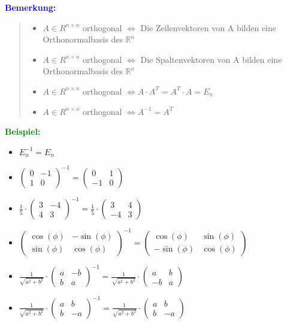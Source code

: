 \documentclass{article}
\newcommand{\blue}[1]{\textcolor{blue}{#1}}
\newcommand{\green}[1]{\textcolor{green}{#1}}
\newcommand{\ex}{\green{\textbf{Beispiel: }}}
\newcommand{\an}[1]{\blue{\textbf{Bemerkung: }}\begin{quote}#1\end{quote}}
\newcommand{\R}{\mathbb{R}}
\begin{document}
\an{
    \begin{itemize}
        \item $A \in R^{n \times n}$ orthogonal $\iff$ Die Zeilenvektoren von A bilden eine Orthonormalbasis des $\R^n$
        \item $A \in R^{n \times n}$ orthogonal $\iff$ Die Spaltenvektoren von A bilden eine Orthonormalbasis des $\R^n$
        \item $A \in R^{n \times n}$ orthogonal $\iff A \cdot A^T = A^T \cdot A = E_n$
        \item $A \in R^{n \times n}$ orthogonal $\iff A^{-1} = A^T$
    \end{itemize}
}

\newpage
\ex \begin{itemize}
    \item $E_n^{-1} = E_n$
    \item $\begin{pmatrix}
        0 & -1\\
        1 & 0
    \end{pmatrix}^{-1} = \begin{pmatrix}
        0 & 1\\
        -1 & 0
    \end{pmatrix}$
    \item $\frac{1}{5} \cdot \begin{pmatrix}
        3 & -4\\
        4 & 3
    \end{pmatrix}^{-1} = \frac{1}{5} \cdot \begin{pmatrix}
        3 & 4\\
        -4 & 3
    \end{pmatrix}$
    \item $\begin{pmatrix}
        \cos(\phi) & -\sin(\phi)\\
        \sin(\phi) & \cos(\phi)
    \end{pmatrix}^{-1} = \begin{pmatrix}
        \cos(\phi) & \sin(\phi)\\
        -\sin(\phi) & \cos(\phi)
    \end{pmatrix}$
    \item $\frac{1}{\sqrt{a^2 + b^2}} \cdot \begin{pmatrix}
        a & -b\\
        b & a
    \end{pmatrix}^{-1} = \frac{1}{\sqrt{a^2 + b^2}} \cdot \begin{pmatrix}
        a & b\\
        -b & a
    \end{pmatrix}$
    \item $\frac{1}{\sqrt{a^2 + b^2}} \cdot \begin{pmatrix}
        a & b\\
        b & -a
    \end{pmatrix}^{-1} = \frac{1}{\sqrt{a^2 + b^2}} \cdot \begin{pmatrix}
        a & b\\
        b & -a
    \end{pmatrix}$
\end{itemize}
\end{document}
